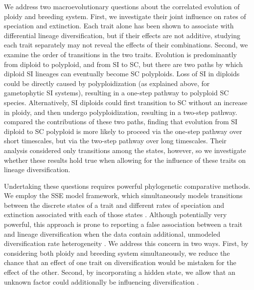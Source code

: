 We address two macroevolutionary questions about the correlated evolution of ploidy and breeding system.
First, we investigate their joint influence on rates of speciation and extinction.
Each trait alone has been shown to associate with differential lineage diversification, but if their effects are not additive, studying each trait separately may not reveal the effects of their combinations.
Second, we examine the order of transitions in the two traits.
Evolution is predominantly from diploid to polyploid, and from SI to SC, but there are two paths by which diploid SI lineages can eventually become SC polyploids.
Loss of SI in diploids could be directly caused by polyploidization (as explained above, for gametophytic SI systems), resulting in a one-step pathway to polyploid SC species. 
Alternatively, SI diploids could first transition to SC without an increase in ploidy, and then undergo polyploidization, resulting in a two-step pathway.
\citet{robertson_2011} compared the contributions of these two paths, finding that evolution from SI diploid to SC polyploid is more likely to proceed via the one-step pathway over short timescales, but via the two-step pathway over long timescales.
Their analysis considered only transitions among the states, however, so we investigate whether these results hold true when allowing for the influence of these traits on lineage diversification.

Undertaking these questions requires powerful phylogenetic comparative methods.
We employ the SSE model framework, which simultaneously models transitions between the discrete states of a trait and different rates of speciation and extinction associated with each of those states \citep{maddison_2007, fitzjohn_2012}.
Although potentially very powerful, this approach is prone to reporting a false association between a trait and lineage diversification when the data contain additional, unmodeled diversification rate heterogeneity \citep{maddison_2015, rabosky_2015}.
We address this concern in two ways.
First, by considering both ploidy and breeding system simultaneously, we reduce the chance that an effect of one trait on diversification would be mistaken for the effect of the other.
Second, by incorporating a hidden state, we allow that an unknown factor could additionally be influencing diversification \citep{beaulieu_2016}.

